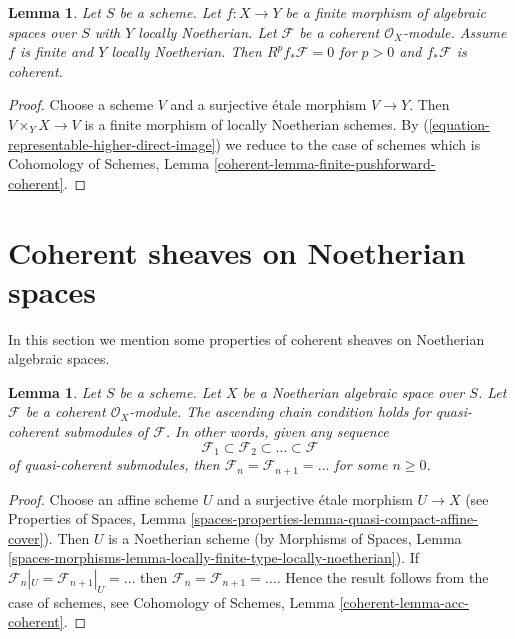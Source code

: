 \documentclass{stacks-project}
\theoremstyle{plain}
\newtheorem{lemma}[subsection]{Lemma}
\theoremstyle{definition}
\theoremstyle{remark}
\numberwithin{equation}{subsection}
\begin{document}
\begin{lemma}
\label{lemma-finite-pushforward-coherent}
Let $S$ be a scheme. Let $f : X \to Y$ be a finite morphism of algebraic
spaces over $S$ with $Y$ locally Noetherian. Let $\mathcal{F}$ be a
coherent $\mathcal{O}_X$-module. Assume $f$ is finite and $Y$ locally
Noetherian. Then $R^pf_*\mathcal{F} = 0$ for $p > 0$ and
$f_*\mathcal{F}$ is coherent.
\end{lemma}

\begin{proof}
Choose a scheme $V$ and a surjective \'etale morphism $V \to Y$.
Then $V \times_Y X \to V$ is a finite morphism of locally Noetherian
schemes. By (\ref{equation-representable-higher-direct-image}) we reduce
to the case of schemes which is
Cohomology of Schemes, Lemma \ref{coherent-lemma-finite-pushforward-coherent}.
\end{proof}






\section{Coherent sheaves on Noetherian spaces}
\label{section-coherent-quasi-compact}

\noindent
In this section we mention some properties of coherent sheaves on
Noetherian algebraic spaces.

\begin{lemma}
\label{lemma-acc-coherent}
Let $S$ be a scheme. Let $X$ be a Noetherian algebraic space over $S$.
Let $\mathcal{F}$ be a coherent $\mathcal{O}_X$-module.
The ascending chain condition holds for quasi-coherent submodules
of $\mathcal{F}$. In other words, given any sequence
$$
\mathcal{F}_1 \subset \mathcal{F}_2 \subset \ldots \subset \mathcal{F}
$$
of quasi-coherent submodules, then
$\mathcal{F}_n = \mathcal{F}_{n + 1} = \ldots $ for some $n \geq 0$.
\end{lemma}

\begin{proof}
Choose an affine scheme $U$ and a surjective \'etale morphism $U \to X$
(see Properties of Spaces, Lemma
\ref{spaces-properties-lemma-quasi-compact-affine-cover}).
Then $U$ is a Noetherian scheme (by
Morphisms of Spaces, Lemma
\ref{spaces-morphisms-lemma-locally-finite-type-locally-noetherian}).
If $\mathcal{F}_n|_U = \mathcal{F}_{n + 1}|_U = \ldots$
then $\mathcal{F}_n = \mathcal{F}_{n + 1} = \ldots$.
Hence the result follows from the case of schemes, see
Cohomology of Schemes, Lemma \ref{coherent-lemma-acc-coherent}.
\end{proof}
\end{document}
